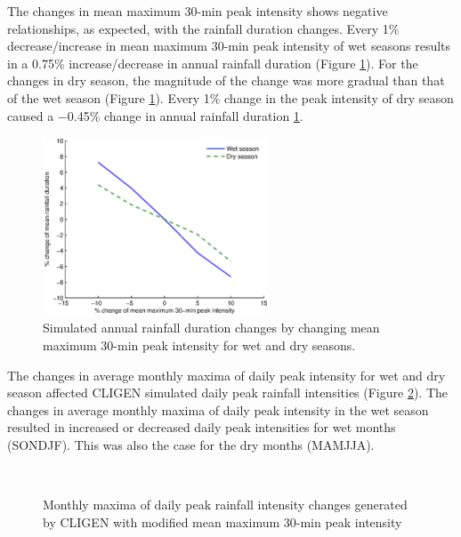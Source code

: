 The changes in mean maximum 30-min peak intensity shows negative relationships,
as expected, with the rainfall duration changes. Every 1\% decrease/increase in
mean maximum 30-min peak intensity of wet seasons results in a 0.75\%
increase/decrease in annual rainfall duration (Figure
\ref{fig:future_rainfall_duration_change}). For the changes in dry season, the
magnitude of the change was more gradual than that of the wet season (Figure
\ref{fig:future_rainfall_duration_change}). Every 1\% change in the peak
intensity of dry season caused a $-$0.45\% change in annual rainfall duration
\ref{fig:future_rainfall_duration_change}.

\begin{figure}[htbp]
  \centering
    \includegraphics[width=0.60\textwidth]
{./img/future_rainfall_duration_change}
  \caption{Simulated annual rainfall duration changes by changing mean
maximum 30-min peak intensity for wet and dry seasons.}
  \label{fig:future_rainfall_duration_change}
\end{figure}

The changes in average monthly maxima of daily peak intensity for wet and dry
season affected CLIGEN simulated daily peak rainfall intensities (Figure
\ref{fig:future_monthly_intensity}). The changes in average monthly maxima of
daily peak intensity in the wet season resulted in increased or decreased daily
peak intensities for wet months (SONDJF). This was also the case for the dry
months (MAMJJA).

\begin{figure}[htbp]
  \centering
    \\
  \caption{Monthly maxima of daily peak rainfall intensity changes
generated by CLIGEN with modified mean maximum 30-min peak intensity}
  \label{fig:future_monthly_intensity}
\end{figure}

